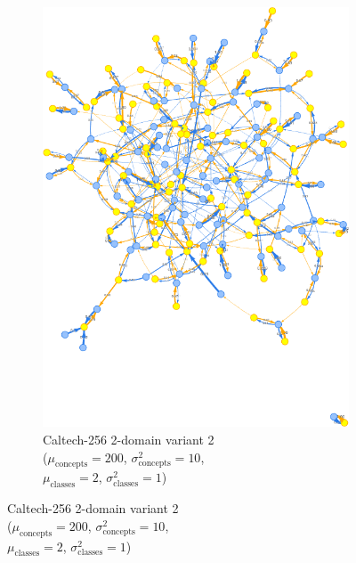 \begin{figure}[ht]
\begin{subfigure}[b]{0.4\textwidth}
            \includegraphics[width=\textwidth]{figures/caltech256_2domain_variant.png}
            \caption{Caltech-256 2-domain variant 2\\
            ($\mu_{\text{concepts}}=200$, $\sigma^2_{\text{concepts}}=10$,\\
            $\mu_{\text{classes}}=2$, $\sigma^2_{\text{classes}}=1$)}
            \label{fig:caltech256_2domain_variant}
      \end{subfigure}


\end{figure}
